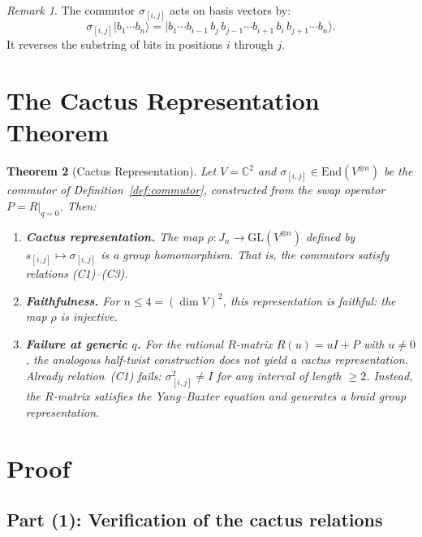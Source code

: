 \documentclass[11pt]{article}
\newtheorem{theorem}{Theorem}
\theoremstyle{remark}
\newtheorem{remark}[theorem]{Remark}
\newcommand{\CC}{\mathbb{C}}
\newcommand{\ket}[1]{|#1\rangle}
\begin{document}
\begin{remark}
The commutor $\sigma_{[i,j]}$ acts on basis vectors by:
\[
  \sigma_{[i,j]}\ket{b_1 \cdots b_n}
  = \ket{b_1 \cdots b_{i-1}\, b_j\, b_{j-1} \cdots b_{i+1}\, b_i\, b_{j+1} \cdots b_n}.
\]
It reverses the substring of bits in positions $i$ through $j$.
\end{remark}

\section{The Cactus Representation Theorem}

\begin{theorem}[Cactus Representation]\label{thm:cactus}
Let $V = \CC^2$ and $\sigma_{[i,j]} \in \mathrm{End}(V^{\otimes n})$ be
the commutor of Definition~\ref{def:commutor}, constructed from the swap
operator $P = R|_{q=0}$. Then:
\begin{enumerate}
  \item \textbf{Cactus representation.}
    The map $\rho\colon J_n \to \mathrm{GL}(V^{\otimes n})$ defined by
    $s_{[i,j]} \mapsto \sigma_{[i,j]}$ is a group homomorphism. That is,
    the commutors satisfy relations \emph{(C1)--(C3)}.
  \item \textbf{Faithfulness.}
    For $n \leq 4 = (\dim V)^2$, this representation is faithful:
    the map $\rho$ is injective.
  \item \textbf{Failure at generic $q$.}
    For the rational $R$-matrix $R(u) = uI + P$ with $u \neq 0$,
    the analogous half-twist construction does \emph{not} yield a cactus
    representation. Already relation~(C1) fails:
    $\sigma_{[i,j]}^2 \neq I$ for any interval of length $\geq 2$.
    Instead, the $R$-matrix satisfies the Yang--Baxter equation and
    generates a braid group representation.
\end{enumerate}
\end{theorem}

\section{Proof}

\subsection{Part (1): Verification of the cactus relations}
\end{document}
